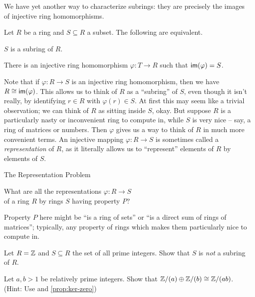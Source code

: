 We have yet another way to characterize subrings: they are precisely the images of injective ring homomorphisms.

\begin{prop}
Let \(R\) be a ring and \(S \subseteq R\) a subset.
The following are equivalent.
\begin{proplist}
\item \(S\) is a subring of \(R\).
\item There is an injective ring homomorphism \(\varphi : T \rightarrow R\) such that \( \mathsf{im}(\varphi)  = S\).
\end{proplist}
\end{prop}

Note that if \(\varphi : R \rightarrow S\) is an injective ring homomorphism, then we have \(R \cong  \mathsf{im}(\varphi) \).
This allows us to think of \(R\) as a ``subring'' of \(S\), even though it isn't really, by identifying \(r \in R\) with \(\varphi(r) \in S\).
At first this may seem like a trivial observation; we can think of \(R\) as sitting inside \(S\), okay.
But suppose \(R\) is a particularly nasty or inconvenient ring to compute in, while \(S\) is very nice -- say, a ring of matrices or numbers.
Then \(\varphi\) gives us a way to think of \(R\) in much more convenient terms.
An injective mapping \(\varphi : R \rightarrow S\) is sometimes called a \emph{representation} of \(R\), as it literally allows us to ``represent'' elements of \(R\) by elements of \(S\).
\begin{titlebox}{The Representation Problem}
\begin{center}
What are all the representations \(\varphi : R \rightarrow S\) \\ of a ring \(R\) by rings \(S\) having property \(P\)?
\end{center}
\end{titlebox}
Property \(P\) here might be ``is a ring of sets'' or ``is a direct sum of rings of matrices''; typically, any property of rings which makes them particularly nice to compute in.



\Exercises%

\begin{exercise}
Let \(R = \mathbb{Z}\) and \(S \subseteq R\) the set of all prime integers.
Show that \(S\) is \emph{not} a subring of \(R\).
\end{exercise}

\begin{exercise}
Let \(a, b > 1\) be relatively prime integers.
Show that \(\mathbb{Z}/(a) \oplus \mathbb{Z}/(b) \cong \mathbb{Z}/(ab)\).
(Hint: Use  and \ref{prop:ker-zero})
\end{exercise}

